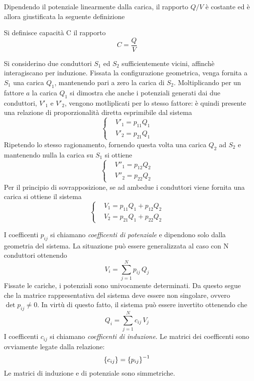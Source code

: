 Dipendendo il potenziale linearmente dalla carica, il rapporto $Q/V$ è costante ed è allora giustificata la seguente definizione
\begin{defn}[Capacità]
    Si definisce capacità C il rapporto
    \[
        C=\frac{Q}{V}
    \]
\end{defn}

Si considerino due conduttori $S_1$ ed $S_2$ sufficientemente vicini, affinchè interagiscano per induzione. Fissata la configurazione
geometrica, venga fornita a $S_1$ una carica $Q_1$, mantenendo pari a zero la carica di $S_2$. Moltiplicando per un fattore
$a$ la carica $Q_1$ si dimostra che anche i potenziali generati dai due conduttori, $V'_1$ e $V'_2$, vengono motliplicati per lo
stesso fattore: è quindi presente una relazione di proporzionalità diretta esprimibile dal sistema
\[
    \begin{cases}
        & V'_1=p_{11}Q_1 \\
        & V'_2=p_{21}Q_1
    \end{cases}
\]
Ripetendo lo stesso ragionamento, fornendo questa volta una carica $Q_2$ ad $S_2$ e mantenendo nulla la carica su
$S_1$ si ottiene
\[
    \begin{cases}
        & V''_1=p_{12}Q_2 \\
        & V''_2=p_{22}Q_2
    \end{cases}
\]
Per il principio di sovrapposizione, se ad ambedue i conduttori viene fornita una carica si ottiene il sistema
\begin{equation}
    \label{eqn:sist_p}
    \begin{cases}
        & V_1=p_{11}Q_1 + p_{12}Q_2\\
        & V_2=p_{21}Q_1 + p_{22}Q_2
    \end{cases}
\end{equation}

I coefficenti $p_{ij}$ si chiamano \textit{coefficenti di potenziale} e dipendono solo dalla geometria del sistema. La
situazione può essere generalizzata al caso con N conduttori ottenendo
\[
    V_i=\sum_{j=1}^N p_{ij}\,Q_j
\]
Fissate le cariche, i potenziali sono univocamente determinati. Da questo segue che la matrice rappresentativa del sistema
deve essere non singolare, ovvero $\det{p_{ij}}\neq 0$. In virtù di questo fatto, il sistema può essere invertito ottenendo che
\[
    Q_i=\sum_{j=1}^N c_{ij}\,V_j
\]
I coefficenti $c_{ij}$ si chiamano \textit{coefficenti di induzione}. Le matrici dei coefficenti sono ovviamente legate dalla relazione:
\[
    \Bqty{c_{ij}}=\Bqty{p_{ij}}^{-1}
\]
Le matrici di induzione e di potenziale sono simmetriche.

